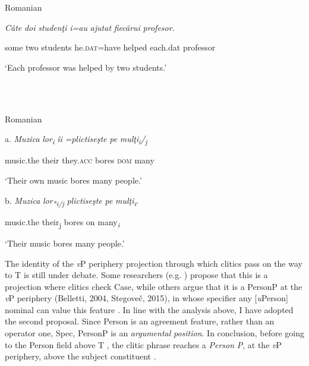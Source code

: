 \documentclass[output=paper,modfonts,nonflat]{langsci/langscibook}
\begin{document}
\ea%
    \label{ex:key:27}
    \gll\\
        \\
    \glt
    \z

           Romanian

\textit{Câte} \textit{doi} \textit{studenţi}  \textit{i=au}     \textit{ajutat}  \textit{fiecărui} \textit{profesor.}

  some two students   he.\textsc{dat}=have   helped   each.dat professor

  ‘Each professor was helped by two students.’

\ea%
    \label{ex:key:28}
    \gll\\
        \\
    \glt
    \z

          Romanian

a.   \textit{Muzica} \textit{lor\textsubscript{i}}  \textit{îi} \textit{=plictiseşte}    \textit{pe} \textit{mulţi\textsubscript{i}}\textit{/\textsubscript{j}}

    music.the their  they.\textsc{acc} bores    \textsc{dom} many

    ‘Their own music bores many people.’

  b.   \textit{Muzica} \textit{lor\textsubscript{*i/j}}    \textit{plictiseşte}  \textit{pe}  \textit{mulţi\textsubscript{i}}.

    music.the their\textsubscript{j} bores    on  many\textit{\textsubscript{i}}

    ‘Their music bores many people.’

The identity of the \textit{v}P periphery projection through which clitics pass on the way to T is still under debate. Some researchers (e.g. \citealt{Ciucivara2009}) propose that this is a projection where clitics check Case, while others argue that it is a PersonP at the \textit{v}P periphery (Belletti, 2004, Stegoveč, 2015), in whose specifier any [\textit{u}Person] nominal can value this feature . In line with the analysis above, I have adopted the second proposal. Since Person is an agreement feature, rather than an operator one, Spec, PersonP is an \textit{argumental} \textit{position}. In conclusion, before going to the Person field above T \citep{Ciucivara2009}, the clitic phrase reaches a \textit{Person} \textit{P}, at the \textit{v}P periphery, above the subject constituent .

\ea%
    \label{ex:key:29}
    \gll\\
        \\
    \glt
    \z
\end{document}
